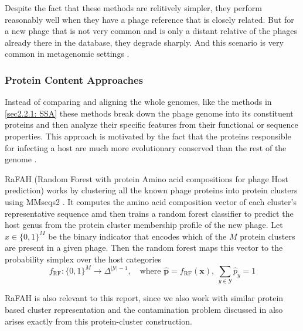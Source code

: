 \vspace{0.15cm}
\noindent Despite the fact that these methods are relitively simpler, they perform reasonably well when they have a phage
reference that is closely related. But for a new phage that is not very common and is only a distant relative of the phages
already there in the database, they degrade sharply. And this scenario is very common in metagenomic settings \cite{coclet2021global}.


\subsubsection{Protein Content Approaches}
\label{sec2.2.2: PCA}
\noindent Instead of comparing and aligning the whole genomes, like the methods in \ref{sec2.2.1: SSA} these methods 
break down the phage genome into its constituent proteins and then analyze their specific features from their functional
or sequence properties. This approach is motivated by the fact that the proteins responsible for infecting a host are much
more evolutionary conserved than the rest of the genome \cite{coutinho2021rafah}.

\vspace{0.15cm}
\noindent RaFAH \cite{coutinho2021rafah} (Random Forest with protein Amino acid compositions for phage Host prediction)
works by clustering all the known phage proteins into protein clusters using MMseqs2 \cite{steinegger2017mmseqs2}.
It computes the amino acid composition vector of each cluster's representative sequence amd then trains a random forest
classifier to predict the host genus from the protein cluster membership profile of the new phage. Let $x \in \{0,1\}^M$ be the 
binary indicator that encodes which of the $M$ protein clusters are present in a given phage. Then the random forest 
maps this vector to the probability simplex over the host categories
$$f_{\text{RF}}: \{0,1\}^M \longrightarrow \Delta^{|\mathcal{Y}|-1}, \quad \text{where } \hat{\mathbf{p}} = 
f_{\text{RF}}(\mathbf{x}), \ \sum_{y \in \mathcal{Y}} \hat{p}_y = 1$$


\vspace{0.15cm}
\noindent RaFAH is also relevant to this report, since we also work with similar protein based cluster representation
and the contamination problem discussed in  also arises exactly from this protein-cluster 
construction.

